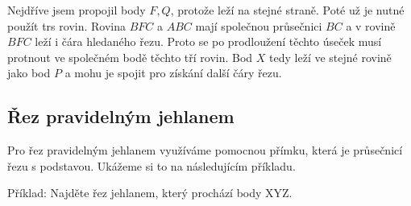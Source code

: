\documentclass[12pt]{article}
\begin{document}
\begin{itemize} [itemsep = 2pt]

Nejdříve jsem propojil body $F, Q$, protože leží na stejné straně. Poté už je 
nutné použít trs rovin. Rovina $BFC$ a $ABC$ mají společnou průsečnici $BC$ a 
v rovině $BFC$ leží i čára hledaného řezu. Proto se po prodloužení těchto úseček 
musí protnout ve společném bodě těchto tří rovin. Bod $X$ tedy leží ve stejné 
rovině jako bod $P$ a mohu je spojit pro získání další čáry řezu.
\end{itemize}

\subsection*{Řez pravidelným jehlanem}
Pro řez pravidelným jehlanem využíváme pomocnou přímku, která je průsečnicí řezu s podstavou. Ukážeme si to na následujícím příkladu.

Příklad: Najděte řez jehlanem, který prochází body XYZ.
\end{document}
